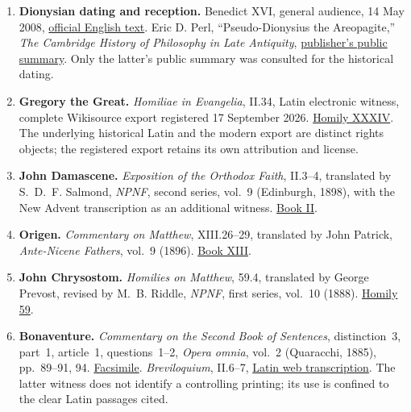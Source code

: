 \begin{enumerate}[leftmargin=1.7em,itemsep=0.5em]
\item \textbf{Dionysian dating and reception.} Benedict XVI,
general audience, 14 May 2008,
\href{https://www.vatican.va/content/benedict-xvi/en/audiences/2008/documents/hf_ben-xvi_aud_20080514.html}{official
English text}. Eric D. Perl, ``Pseudo-Dionysius the Areopagite,''
\emph{The Cambridge History of Philosophy in Late Antiquity},
\href{https://doi.org/10.1017/CHOL9780521194846.014}{publisher's public summary}.
Only the latter's public summary was consulted for the historical dating.

\item \textbf{Gregory the Great.} \emph{Homiliae in Evangelia},
II.34, Latin electronic witness, complete Wikisource export registered
17 September 2026.
\href{https://la.wikisource.org/wiki/Homiliarum_in_Evangelia/XXXIV}{Homily XXXIV}.
The underlying historical Latin and the modern export are distinct rights
objects; the registered export retains its own attribution and license.

\item \textbf{John Damascene.} \emph{Exposition of the Orthodox Faith},
II.3--4, translated by S.~D.~F. Salmond,
\emph{NPNF}, second series, vol.~9 (Edinburgh, 1898),
with the New Advent transcription as an additional witness.
\href{https://www.newadvent.org/fathers/33042.htm}{Book II}.

\item \textbf{Origen.} \emph{Commentary on Matthew}, XIII.26--29,
translated by John Patrick, \emph{Ante-Nicene Fathers}, vol.~9 (1896).
\href{https://www.newadvent.org/fathers/101613.htm}{Book XIII}.

\item \textbf{John Chrysostom.} \emph{Homilies on Matthew}, 59.4,
translated by George Prevost, revised by M.~B. Riddle,
\emph{NPNF}, first series, vol.~10 (1888).
\href{https://www.newadvent.org/fathers/200159.htm}{Homily 59}.

\item \textbf{Bonaventure.} \emph{Commentary on the Second Book of
Sentences}, distinction~3, part~1, article~1, questions~1--2,
\emph{Opera omnia}, vol.~2 (Quaracchi, 1885), pp.~89--91, 94.
\href{https://archive.org/details/doctorisseraphic02bona}{Facsimile}.
\emph{Breviloquium}, II.6--7,
\href{https://catholiclibrary.org/library/view?docId=/Medieval-OR/BonaventuraSBreviloquium.00000158.la.html}{Latin
web transcription}. The latter witness does not identify a controlling
printing; its use is confined to the clear Latin passages cited.


\end{enumerate}

